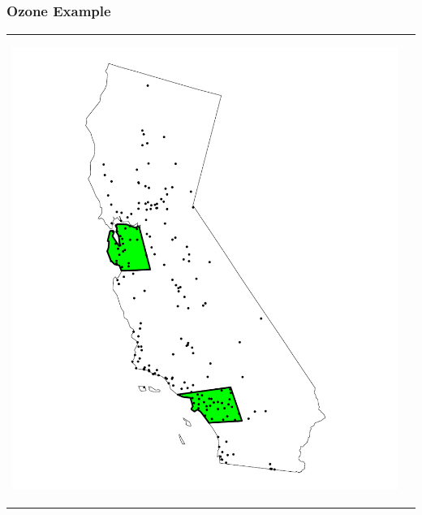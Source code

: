\documentclass[mathserif,compress]{beamer}\usepackage{graphicx, color}
\makeatletter
\def\maxwidth{ %
  \ifdim\Gin@nat@width>\linewidth
    \linewidth
  \else
    \Gin@nat@width
  \fi
}
\makeatother
\begin{document}
\subsection{}
\begin{frame}[fragile]
\frametitle{Ozone Example}




	\begin{tabular} {p{4.5cm} p{4.5cm}}
		\vspace{.1cm}
		\begin{center}
			\includegraphics[width = \maxwidth]{figure/CApolys-plot} 
		\end{center} &
		\vspace{-.7cm}
		\begin{center}

\end{center}
\end{tabular}
\end{frame}
\end{document}
